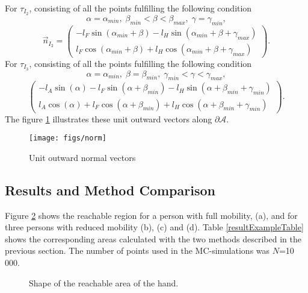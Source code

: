 For $\tau_{I_2}$, consisting of all the points fulfilling the following condition
%
\[
  \alpha = \alpha_{min},\;
  \beta_{min} < \beta < \beta_{max},\;
  \gamma = \gamma_{min},
\]
%
%
\[
\vec n_{I_2} =
\begin{pmatrix}
 - l_F \sin(\alpha_{min} + \beta) - l_H\sin(\alpha_{min}+\beta + \gamma_{max}) \\
l_F \cos(\alpha_{min} + \beta) + l_H\cos(\alpha_{min}+\beta + \gamma_{max})
\end{pmatrix}.
\]
For $\tau_{I_3}$, consisting of all the points fulfilling the following condition
%
\[
  \alpha = \alpha_{min},\;
  \beta=\beta_{min},\;
  \gamma_{min} < \gamma < \gamma_{max},
\]
%
\[
\begin{pmatrix}
 -l_A \sin(\alpha) - l_F \sin(\alpha + \beta_{min}) - l_H\sin(\alpha+\beta_{min} + \gamma_{min}) \\
 l_A \cos(\alpha) + l_F \cos(\alpha + \beta_{min}) + l_H\cos(\alpha+\beta_{min} + \gamma_{min})
\end{pmatrix}.
\]
%
The figure \ref{fig:normv} illustrates these unit outward vectors along $\partial \mathcal{A}$.
%
\begin{figure}[!ht]
  \centering
  \label{fig:normv}
  \texttt{[image: figs/norm]}
  \caption{Unit outward normal vectors}
 \label{fig:normv}
\end{figure}

\subsection{Results and Method Comparison}

Figure \ref{fig:compar} shows the reachable region for a person with full mobility, (a), and for three persons with reduced mobility (b), (c) and (d). Table \ref{resultExampleTable}  shows the corresponding areas calculated with the two methods described in the previous section. The number of points used in the MC-simulations was $N$=10 000.

\begin{figure}[!ht]
  \centering
  \caption{Shape of the reachable area of the hand. \label{fig:compar}}
\end{figure}

